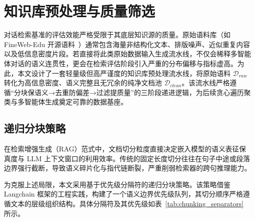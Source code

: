 \section{知识库预处理与质量筛选}

\label{sec:kb_curation}



对话检索基准的评估效能严格受限于其底层知识源的质量。原始语料库（如 FineWeb-Edu 开源语料~\citep{penedo2024finewebedufineweb}）通常包含海量非结构化文本、排版噪声、近似重复内容以及低信息密度片段。若直接将此类原始数据输入生成流水线，不仅会稀释多智能体对话的语义连贯性，更会在检索评估阶段引入严重的分布偏移与指标虚高。为此，本文设计了一套轻量级但高严谨度的知识库预处理流水线，将原始语料 $\mathcal{D}_{raw}$ 转化为高信息密度、语义完整且无冗余的纯净文档池 $\mathcal{D}_{clean}$。该流水线严格遵循“分块保语义→去重防偏差→过滤提质量”的三阶段递进逻辑，为后续贪心遍历聚类与多智能体生成奠定可靠的数据基座。



\subsection{递归分块策略}

\label{subsec:recursive_chunking}



在检索增强生成（RAG）范式中，文档切分粒度直接决定嵌入模型的语义表征保真度与 LLM 上下文窗口的利用效率。传统的固定长度切分往往在句子中途或段落边界强行截断，导致语义碎片化与指代链断裂，严重削弱检索器的跨句推理能力。



为克服上述局限，本文采用基于优先级分隔符的递归分块策略。该策略借鉴 Langchain 框架的工程实践，构建了一个语义边界优先级队列，其切分顺序严格遵循文本的层级组织结构。具体分隔符及其优先级如表~\ref{tab:chunking_separators} 所示。



